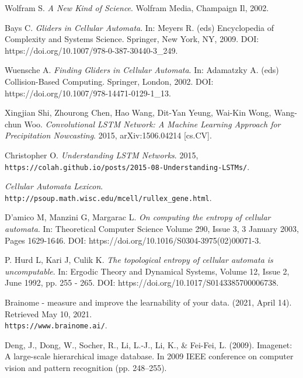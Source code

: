 \documentclass[12pt]{article}
\numberwithin{figure}{section} %
\begin{document}
\begin{thebibliography}{9}
Wolfram S.
\textit{A New Kind of Science}. 
Wolfram Media, Champaign Il, 2002. 

Bays C.
\textit{Gliders in Cellular Automata}. 
In: Meyers R. (eds) Encyclopedia of Complexity and Systems Science. Springer, New York, NY, 2009.
DOI: https://doi.org/10.1007/978-0-387-30440-3\_249. 

Wuensche A.
\textit{Finding Gliders in Cellular Automata}. 
In: Adamatzky A. (eds) Collision-Based Computing. Springer, London, 2002. 
DOI: https://doi.org/10.1007/978-14471-0129-1\_13.

Xingjian Shi, Zhourong Chen, Hao Wang, Dit-Yan Yeung, Wai-Kin Wong, Wang-chun Woo. 
\textit{Convolutional LSTM Network: A Machine Learning Approach for Precipitation Nowcasting}. 
2015, arXiv:1506.04214 [cs.CV]. 

Christopher O.
\textit{Understanding LSTM Networks}. 
2015, \\\texttt{https://colah.github.io/posts/2015-08-Understanding-LSTMs/}. 

\textit{Cellular Automata Lexicon}.
\\\texttt{http://psoup.math.wisc.edu/mcell/rullex\_gene.html}. 

D'amico M, Manzini G, Margarac L.
\textit{On computing the entropy of cellular automata}.
In: Theoretical Computer Science Volume 290, Issue 3, 3 January 2003, Pages 1629-1646.
DOI: https://doi.org/10.1016/S0304-3975(02)00071-3. 

P. Hurd L, Kari J, Culik K. 
\textit{The topological entropy of cellular automata is uncomputable}.
In: Ergodic Theory and Dynamical Systems, Volume 12, Issue 2, June 1992, pp. 255 - 265. 
DOI: https://doi.org/10.1017/S0143385700006738. 

Brainome - measure and improve the learnability of your data. (2021, April 14). Retrieved May 10, 2021. 
\\\texttt{https://www.brainome.ai/}. 

Deng, J., Dong, W., Socher, R., Li, L.-J., Li, K., \& Fei-Fei, L. (2009). Imagenet: A large-scale hierarchical image database. In 2009 IEEE conference on computer vision and pattern recognition (pp. 248–255).


\end{thebibliography}
\end{document}
